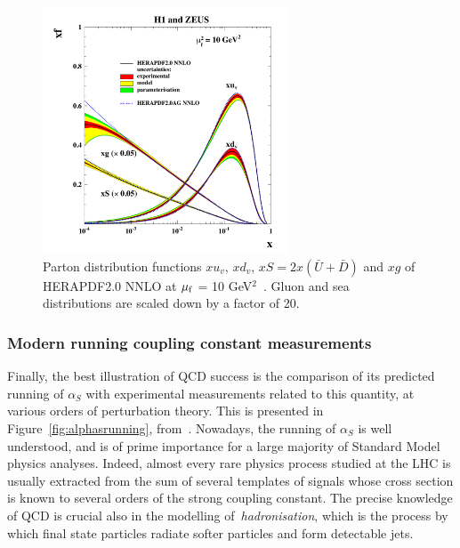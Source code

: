 \begin{figure}[htb]
\begin{center}
  \includegraphics[width=0.65\textwidth]{Chapters/pQCD/DIS_HERA.pdf}
 \caption{Parton distribution functions $xu_v$, $xd_v$, $xS =
   2x(\bar{U}+\bar{D})$ and $xg$ of HERAPDF2.0 NNLO at $\mu_{\rm f}$ =
   10 GeV$^{2}$~\cite{HERA_END}. Gluon and sea distributions are scaled down by a
   factor of 20.}
 \label{fig:DIS_HERA}
\end{center}
\end{figure}


\subsubsection{Modern running coupling constant measurements}
\label{sec:alphasrunning}

Finally, the best illustration of QCD success is the comparison of its
predicted running of $\alpha_S$ with experimental measurements related
to this quantity, at various orders of perturbation theory. This is
presented in Figure~\ref{fig:alphasrunning},
from~\cite{Agashe:2014kda}. Nowadays, the running of $\alpha_S$ is
well understood, and is of prime importance for a large majority of
Standard Model physics analyses. Indeed, almost every rare physics
process studied at the LHC is usually extracted from the sum of several
templates of signals whose cross section is known to
several orders of the strong coupling constant. The precise knowledge
of QCD is crucial also in the modelling of~\textit{hadronisation},
which is the process by which final state particles radiate softer
particles and form detectable jets.

